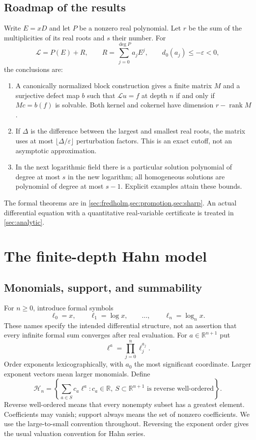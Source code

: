 \documentclass[11pt,a4paper]{article}
\numberwithin{equation}{section}
\theoremstyle{definition}
\theoremstyle{remark}
\newcommand{\R}{\mathbb R}
\newcommand{\HH}{\mathcal H}
\newcommand{\cL}{\mathcal L}
\newcommand{\rank}{\operatorname{rank}}
\newcommand{\dprim}{d_0}
\newcommand{\eps}{\varepsilon}
\begin{document}
\subsection{Roadmap of the results}
Write $E=xD$ and let $P$ be a nonzero real polynomial. Let $r$ be the sum of the multiplicities of its real roots and $s$ their number. For
\begin{equation}
 \cL=P(E)+R,\qquad
 R=\sum_{j=0}^{\deg P}a_jE^j,
 \qquad \dprim(a_j)\le-\eps<0,
 \label{eq:main-class}
\end{equation}
the conclusions are:
\begin{enumerate}[label=(\roman*),leftmargin=2em,itemsep=3pt]
\item A canonically normalized block construction gives a finite matrix $M$ and a surjective defect map $b$ such that $\cL u=f$ at depth $n$ if and only if $Mc=b(f)$ is solvable. Both kernel and cokernel have dimension $r-\rank M$.
\item If $\Delta$ is the difference between the largest and smallest real roots, the matrix uses at most $\lfloor\Delta/\eps\rfloor$ perturbation factors. This is an exact cutoff, not an asymptotic approximation.
\item In the next logarithmic field there is a particular solution polynomial of degree at most $s$ in the new logarithm; all homogeneous solutions are polynomial of degree at most $s-1$. Explicit examples attain these bounds.
\end{enumerate}
The formal theorems are in \cref{sec:fredholm,sec:promotion,sec:sharp}. An actual differential equation with a quantitative real-variable certificate is treated in \cref{sec:analytic}.

\section{The finite-depth Hahn model}
\label{sec:model}

\subsection{Monomials, support, and summability}
For $n\ge0$, introduce formal symbols
\[
 \ell_0=x,\qquad \ell_1=\log x,\qquad\ldots,\qquad\ell_n=\log_n x.
\]
These names specify the intended differential structure, not an assertion that every infinite formal sum converges after real evaluation. For $a\in\R^{n+1}$ put
\[
 \ell^a=\prod_{j=0}^{n}\ell_j^{a_j}.
\]
Order exponents lexicographically, with $a_0$ the most significant coordinate. Larger exponent vectors mean larger monomials. Define
\begin{equation}
 \HH_n=\left\{\sum_{a\in S}c_a\ell^a:
 c_a\in\R,\ S\subset\R^{n+1}\text{ is reverse well-ordered}\right\}.
 \label{eq:hahn-field}
\end{equation}
Reverse well-ordered means that every nonempty subset has a greatest element. Coefficients may vanish; support always means the set of nonzero coefficients. We use the large-to-small convention throughout. Reversing the exponent order gives the usual valuation convention for Hahn series.
\end{document}
